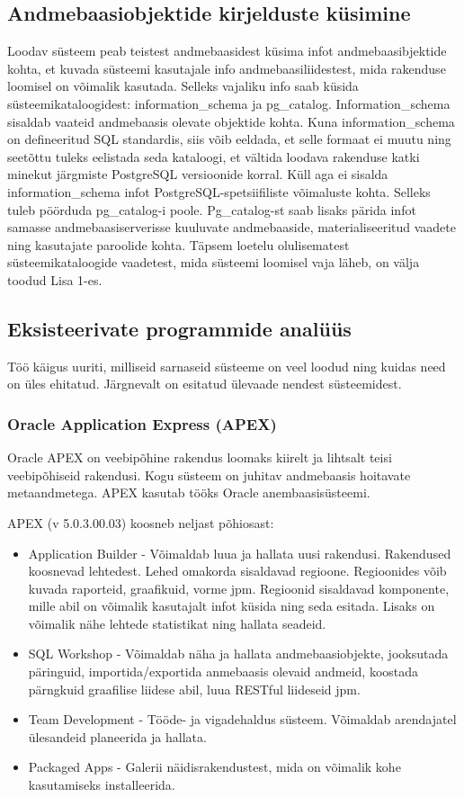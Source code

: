 \documentclass[a4paper,12pt]{article} %
\begin{document}
\subsection{Andmebaasiobjektide kirjelduste küsimine}
\label{andmebaasi_objektide_kirjelduste_küsimine}
Loodav süsteem peab teistest andmebaasidest küsima infot andmebaasibjektide kohta, et kuvada süsteemi kasutajale info andmebaasiliidestest, mida rakenduse loomisel on võimalik kasutada. Selleks vajaliku info saab küsida süsteemikataloogidest: information\_schema ja pg\_catalog.
Information\_schema sisaldab vaateid andmebaasis olevate objektide kohta. Kuna information\_schema on defineeritud SQL standardis, siis võib eeldada, et selle formaat ei muutu ning seetõttu tuleks eelistada seda kataloogi, et vältida loodava rakenduse katki minekut  järgmiste PostgreSQL versioonide korral. \cite{PostgreSQLInformationSchema} Küll aga ei sisalda information\_schema infot PostgreSQL-spetsiifiliste võimaluste kohta. Selleks tuleb pöörduda pg\_catalog-i poole. Pg\_catalog-st saab lisaks pärida infot samasse andmebaasiserverisse kuuluvate andmebaaside, materialiseeritud vaadete ning kasutajate paroolide kohta. \cite{PostgreSQLSystemCatalogs} Täpsem loetelu olulisematest süsteemikataloogide vaadetest, mida süsteemi loomisel vaja läheb, on välja toodud Lisa 1-es.

\subsection{Eksisteerivate programmide analüüs}
Töö käigus uuriti, milliseid sarnaseid süsteeme on veel loodud ning kuidas need on üles ehitatud. Järgnevalt on esitatud ülevaade nendest süsteemidest.
\subsubsection{Oracle Application Express (APEX)}
Oracle APEX on veebipõhine rakendus loomaks kiirelt ja lihtsalt teisi veebipõhiseid rakendusi. Kogu süsteem on juhitav andmebaasis hoitavate metaandmetega. APEX kasutab tööks Oracle anembaasisüsteemi.\par
APEX (v 5.0.3.00.03) koosneb neljast põhiosast:
\begin{itemize}
\item Application Builder - Võimaldab luua ja hallata uusi rakendusi. Rakendused koosnevad lehtedest. Lehed omakorda sisaldavad regioone. Regioonides võib kuvada raporteid, graafikuid, vorme jpm. Regioonid sisaldavad komponente, mille abil on võimalik kasutajalt infot küsida ning seda esitada. Lisaks on võimalik nähe lehtede statistikat ning hallata seadeid.
\item SQL Workshop - Võimaldab näha ja hallata andmebaasiobjekte, jooksutada päringuid, importida/exportida anmebaasis olevaid andmeid, koostada pärngkuid graafilise liidese abil, luua RESTful liideseid jpm.
\item Team Development - Tööde- ja vigadehaldus süsteem. Võimaldab arendajatel ülesandeid planeerida ja hallata.
\item Packaged Apps - Galerii näidisrakendustest, mida on võimalik kohe kasutamiseks installeerida.
\end{itemize}
\cite{Oracle_APEX}
\end{document}
